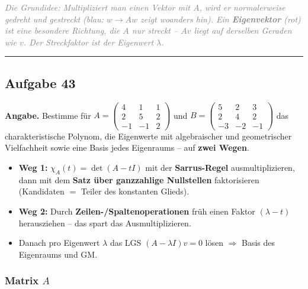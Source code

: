 \documentclass[a4paper,12pt]{article}
\newcommand{\EW}{Eigenwert}
\newcommand{\EV}{Eigenvektor}
\begin{document}
\textcolor{gray}{\small\textit{Die Grundidee: Multipliziert man einen Vektor mit $A$, wird er normalerweise gedreht \emph{und} gestreckt (blau: $w \to Aw$ zeigt woanders hin). Ein \textbf{\EV} (rot) ist eine besondere Richtung, die $A$ \emph{nur streckt} -- $Av$ liegt auf derselben Geraden wie $v$. Der Streckfaktor ist der \EW{} $\lambda$.}}

\bigskip
\hrule
\bigskip

\subsection*{Aufgabe 43}

\textbf{Angabe.} Bestimme f\"ur $A = \begin{pmatrix} 4 & 1 & 1 \\ 2 & 5 & 2 \\ -1 & -1 & 2 \end{pmatrix}$ und $B = \begin{pmatrix} 5 & 2 & 3 \\ 2 & 4 & 2 \\ -3 & -2 & -1 \end{pmatrix}$
das charakteristische Polynom, die \EW{}e mit algebraischer und geometrischer Vielfachheit sowie eine Basis jedes Eigenraums -- auf \textbf{zwei Wegen}.

\begin{wastun}
\begin{itemize}[leftmargin=*, nosep]
    \item \textbf{Weg 1:} $\chi_A(t) = \det(A - tI)$ mit der \textbf{Sarrus-Regel} ausmultiplizieren, dann mit dem \textbf{Satz \"uber ganzzahlige Nullstellen} faktorisieren (Kandidaten $=$ Teiler des konstanten Glieds).
    \item \textbf{Weg 2:} Durch \textbf{Zeilen-/Spaltenoperationen} fr\"uh einen Faktor $(\lambda - t)$ herausziehen -- das spart das Ausmultiplizieren.
    \item Danach pro \EW{} $\lambda$ das LGS $(A - \lambda I)v = 0$ l\"osen $\Rightarrow$ Basis des Eigenraums und GM.
\end{itemize}
\end{wastun}

\subsubsection*{Matrix $A$}
\end{document}
